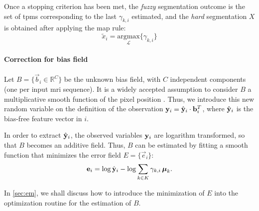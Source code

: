 Once a stopping criterion has been met, the \emph{fuzzy} segmentation
  outcome is the set of \glspl*{tpm} corresponding to the last $\gamma_{k,i}$
  estimated, and the \emph{hard} segmentation $X$ is obtained after
  applying the \gls*{map} rule:
\begin{equation}
\label{eq:map}
\tilde{x}_i = \underset{\mathcal{L}}{\textrm{argmax}} \lbrace \gamma_{k,i} \rbrace
\end{equation}


\paragraph{Correction for bias field}
\label{sec:bias_model}
Let $B = \lbrace \vec{b}_i \in \mathbb{R}^C \rbrace$ be the unknown bias field,
  with $C$ independent components (one per input \gls*{mri} sequence).
It is a widely accepted assumption to consider $B$ a multiplicative smooth
  function of the pixel position \citep{vovk_review_2007}. Thus,
  we introduce this new random variable on the definition of the observation
  $\mathbf{y}_i = \hat{\mathbf{y}}_i \cdot \mathbf{b}^{T}_i$, where $\hat{\mathbf{y}}_i$
  is the bias-free feature vector in $i$.
  
In order to extract $\hat{\mathbf{y}}_i$, the observed variables $\mathbf{y}_{i}$
  are logarithm transformed, so that $B$ becomes an additive field.
Thus, $B$ can be estimated by fitting a smooth function that minimizes
  the error field $E = \lbrace \vec{e}_i \rbrace$:
\begin{equation}
\label{eq:bias_error}
\mathbf{e}_{i} = \log{\hat{\ensuremath{\mathbf{y}}}_{i}} - \log{\sum_{k\in K} \gamma_{k,i}\,\boldsymbol{\mu}_{k}}.
\end{equation} %

In \autoref{sec:em}, we shall discuss how to introduce the minimization
  of $E$ into the optimization routine for the estimation of $B$.
  
